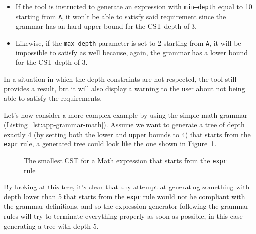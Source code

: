 \documentclass[]{usiinfbachelorproject}
\begin{document}
\begin{itemize}
\item If the tool is instructed to generate an expression with
      \texttt{min–depth} equal to 10 starting from \texttt{A}, it won't be
      able to satisfy said requirement since the grammar has an hard upper bound
      for the CST depth of 3.
\item Likewise, if the \texttt{max-depth} parameter is set to 2 starting from
      \texttt{A}, it will be impossible to satisfy as well because, again, the
      grammar has a lower bound for the CST depth of 3.
\end{itemize}

In a situation in which the depth constraints are not respected, the tool still
provides a result, but it will also display a warning to the user about not
being able to satisfy the requirements.

Let's now consider a more complex example by using the simple math grammar
(Listing~\ref{lst:app-grammar-math}). Assume we want to generate a tree of
depth exactly 4 (by setting both the lower and upper bounds to 4) that starts
from the \texttt{expr} rule, a generated tree could look like the one shown in
Figure~\ref{user-constraints-cst-expr}.

\begin{figure}[ht]
\centering
{}
\caption{The smallest CST for a Math expression that starts from
the \texttt{expr} rule
}\label{user-constraints-cst-expr}
\end{figure}

By looking at this tree, it's clear that any attempt at generating something
with depth lower than 5 that starts from the \texttt{expr} rule would not be
compliant with the grammar definitions, and so the expression generator
following the grammar rules will try to terminate everything properly as soon
as possible, in this case generating a tree with depth 5.
\end{document}
